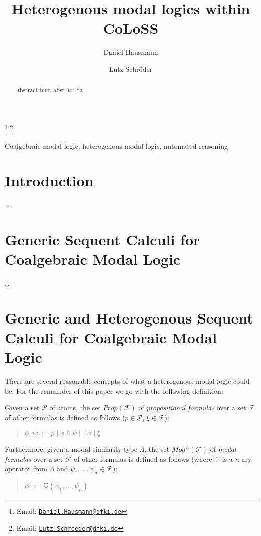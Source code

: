 \documentclass{entcs}
\newcommand{\hearts}{\heartsuit}
\newcommand{\COLOSS}{{\textrm CoLoSS}}
\begin{document}
\begin{frontmatter}
  \title{Heterogenous modal logics within \COLOSS}
  \author[DFKI]{Daniel Hausmann}
  \author[DFKI,UBremen]{Lutz Schr\"oder}
  \address[DFKI]{DFKI Bremen, SKS}
  \address[UBremen]{Department of Mathematics and Computer Science, Universit\"at Bremen, Germany}
  \thanks[myemail]{Email: \href{mailto:Daniel.Hausmann@dfki.de} {\texttt{\normalshape Daniel.Hausmann@dfki.de}}}
  \thanks[coemail]{Email: \href{mailto:Lutz.Schroeder@dfki.de} {\texttt{\normalshape Lutz.Schroeder@dfki.de}}}
\begin{abstract} 
abstract hier, abstract da
\end{abstract}
\begin{keyword}
  Coalgebraic modal logic, heterogenous modal logic, automated reasoning
\end{keyword}
\end{frontmatter}
\section{Introduction}\label{intro}
 
\ldots

\section{Generic Sequent Calculi for Coalgebraic Modal Logic}

\ldots

\section{Generic and Heterogenous Sequent Calculi for Coalgebraic Modal Logic}

There are several reasonable concepts of what a heterogenous modal logic could be. For the remainder
of this paper we go with the following definition:

\begin{definition}
Given a set $\mathcal{P}$ of atoms, the set $Prop(\mathcal{F})$ of \emph{propositional formulas} over
a set $\mathcal{F}$ of other formulas is defined as follows ($p\in\mathcal{P}$, $\xi\in\mathcal{F}$):
\begin{quote}
$\phi,\psi::= p\mid \phi\wedge\psi\mid\neg\phi\mid \xi$
\end{quote}
Furthermore, given a modal similarity type $\Lambda$, the set $Mod^\Lambda(\mathcal{F})$ of \emph{modal formulas}
over a set $\mathcal{F}$ of other formulas is defined as follows (where $\hearts$ is a $n$-ary operator
from $\Lambda$ and $\psi_1,\ldots,\psi_n\in\mathcal{F}$):
\begin{quote}
$\phi::= \hearts(\psi_1,\dots,\psi_n)$
\end{quote}
\end{definition}
\end{document}
